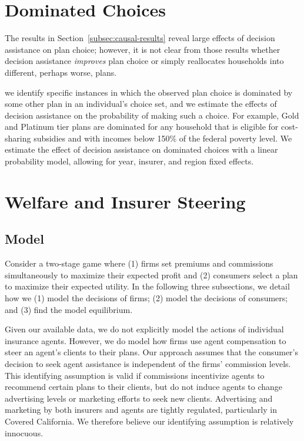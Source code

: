 \documentclass[12pt]{article}
\begin{document}
\section{Dominated Choices}
\label{sec:dominated}
The results in Section~\ref{subsec:causal-results} reveal large effects of decision assistance on plan choice; however, it is not clear from those results whether decision assistance \textit{improves} plan choice or simply reallocates households into different, perhaps worse, plans. 

we identify specific instances in which the observed plan choice is dominated by some other plan in an individual's choice set, and we estimate the effects of decision assistance on the probability of making such a choice. For example, Gold and Platinum tier plans are dominated for any household that is eligible for cost-sharing subsidies and with incomes below 150\% of the federal poverty level. We estimate the effect of decision assistance on dominated choices with a linear probability model, allowing for year, insurer, and region fixed effects.


\section{Welfare and Insurer Steering}
\label{sec:steering}

\subsection{Model}
\label{subsec:steering-model}

Consider a two-stage  game where  (1) firms set premiums and commissions simultaneously to maximize their expected profit and (2) consumers select a plan to maximize their expected utility. In the following three subsections, we detail how we (1) model the decisions of firms; (2) model the decisions of consumers; and (3) find the model equilibrium.  

Given our available data, we do not explicitly model the actions of individual insurance agents.  However, we do model how firms use agent compensation to steer an agent's clients to their plans.  Our approach assumes that the consumer's decision to seek agent assistance is independent of the firms' commission levels.  This identifying assumption is valid if commissions incentivize agents to recommend certain plans to their clients, but do not induce agents to change advertising levels or marketing efforts to  seek new clients. Advertising and marketing by both insurers and agents are tightly regulated, particularly in Covered California.  We therefore believe our identifying assumption is relatively  innocuous.   
\end{document}
